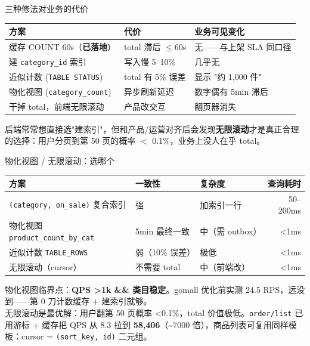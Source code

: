 \documentclass[aspectratio=169,11pt]{beamer}
\begin{document}
\begin{frame}[shrink]{三种修法对业务的代价}
\begin{tabular}{@{}lll@{}}
\toprule
方案 & 代价 & 业务可见变化 \\
\midrule
缓存 COUNT 60s（\textbf{已落地}） & total 滞后 $\le$60s & 无——与上架 SLA 同口径 \\
建 \texttt{category\_id} 索引 & 写入慢 5--10\% & 几乎无 \\
近似计数 (\texttt{TABLE STATUS}) & total 有 5\% 误差 & 显示 "约 1{,}000 件" \\
物化视图 (\texttt{category\_count}) & 异步刷新延迟 & 数字偶有 5min 滞后 \\
干掉 total，前端无限滚动 & 产品改交互 & 翻页器消失 \\
\bottomrule
\end{tabular}
\vspace{3mm}
\small 后端常常想直接选"建索引"，但和产品/运营对齐后会发现\textbf{无限滚动}才是真正合理的选择：用户分页到第 50 页的概率 $<$ 0.1\%，业务上没人在乎 total。
\end{frame}

\begin{frame}[shrink]{物化视图 / 无限滚动：选哪个}
\begin{tabular}{@{}lllr@{}}
\toprule
方案 & 一致性 & 复杂度 & 查询耗时 \\
\midrule
\texttt{(category, on\_sale)} 复合索引 & 强 & 加索引一行 & 50--200ms \\
物化视图 \texttt{product\_count\_by\_cat} & 5min 最终一致 & 中（需 outbox） & \textless 1ms \\
近似计数 \texttt{TABLE\_ROWS} & 弱（10\% 误差） & 极低 & \textless 1ms \\
无限滚动（cursor） & 不需要 total & 中（前端改） & \textless 1ms \\
\bottomrule
\end{tabular}
\vspace{2mm}
\small 物化视图临界点：\textbf{QPS \textgreater 1k \&\& 类目稳定}。gomall 优化前实测 24.5 RPS，远没到——第 0 刀计数缓存 + 建索引就够。\\
无限滚动是最优解：用户翻第 50 页概率 \textless 0.1\%，total 价值极低。\texttt{order/list} 已用游标 + 缓存把 QPS 从 8.3 拉到 \textbf{58{,}406}（\textasciitilde 7000 倍），商品列表可复用同样模板：cursor = \texttt{(sort\_key, id)} 二元组。
\end{frame}
\end{document}
